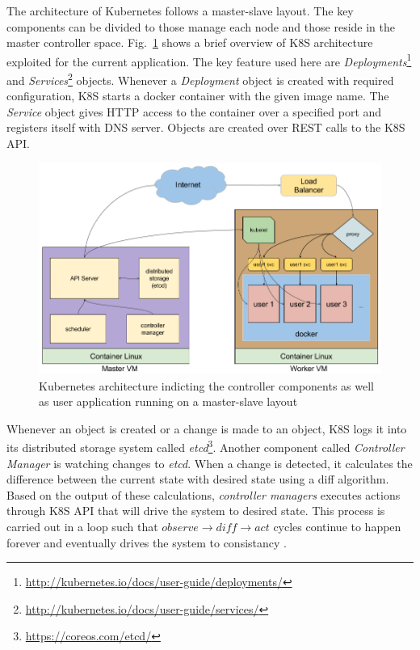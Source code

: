 \documentclass[DD]{iitmdiss}
\begin{document}
The architecture of Kubernetes follows a master-slave layout. The key components can be divided to those manage each node and those reside in the master controller space. Fig.~\ref{fig:systeminternalarch} shows a brief overview of K8S architecture exploited for the current application. The key feature used here are \textit{Deployments}\footnote{\url{http://kubernetes.io/docs/user-guide/deployments/}} and \textit{Services}\footnote{\url{http://kubernetes.io/docs/user-guide/services/}} objects. Whenever a \textit{Deployment} object is created with required configuration, K8S starts a docker container with the given image name. The \textit{Service} object gives HTTP access to the container over a specified port and registers itself with DNS server. Objects are created over REST calls to the K8S API.

\begin{figure}
	\centering
	\includegraphics[width=0.9\linewidth]{img/system_internal_arch}
	\caption[Kubernetes architecture]{Kubernetes architecture indicting the controller components as well as user application running on a master-slave layout}
	\label{fig:systeminternalarch}
\end{figure}

Whenever an object is created or a change is made to an object, K8S logs it into its distributed storage system called \textit{etcd}\footnote{\url{https://coreos.com/etcd/}}. Another component called \textit{Controller Manager} is watching changes to \textit{etcd}. When a change is detected, it calculates the difference between the current state with desired state using a diff algorithm. Based on the output of these calculations, \textit{controller managers} executes actions through K8S API that will drive the system to desired state. This process is carried out in a loop such that $observe \rightarrow diff \rightarrow act$ cycles continue to happen forever and eventually drives the system to consistancy \citep{vogels_eventually_2009}.
\end{document}
